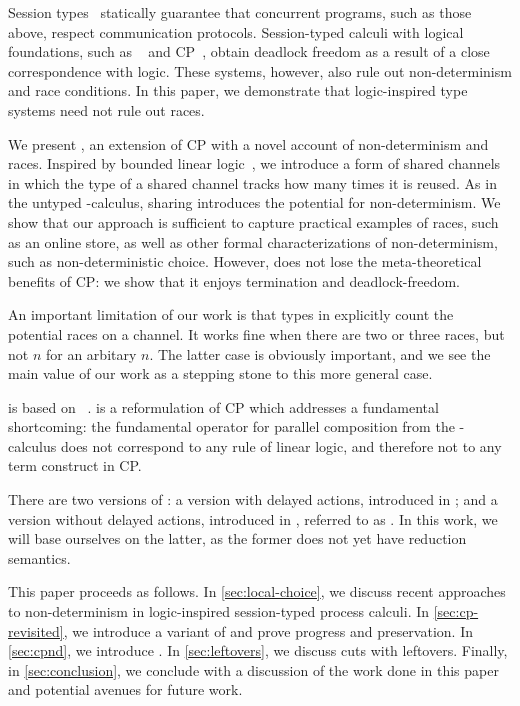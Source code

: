 \documentclass[envcountsame,envcountsect,UKenglish]{llncs}
\begin{document}
Session types~\parencite{honda1993} statically guarantee that concurrent programs, such as those above, respect communication protocols. Session-typed calculi with logical foundations, such as \piDILL~\parencite{caires2010} and CP~\parencite{wadler2012}, obtain deadlock freedom as a result of a close correspondence with logic. These systems, however, also rule out non-determinism and race conditions. In this paper, we demonstrate that logic-inspired type systems need not rule out races.

We present \nodcap, an extension of CP with a novel account of non-determinism and races. Inspired by bounded linear logic~\parencite{girard1992}, we introduce a form of shared channels in which the type of a shared channel tracks how many times it is reused. As in the untyped \textpi-calculus, sharing introduces the potential for non-determinism. We show that our approach is sufficient to capture practical examples of races, such as an online store, as well as other formal characterizations of non-determinism, such as non-deterministic choice.  However, \nodcap does not lose the meta-theoretical benefits of CP: we show that it enjoys termination and deadlock-freedom.

An important limitation of our work is that types in \nodcap explicitly count the potential races on a channel.  It works fine when there are two or three races, but not $n$ for an arbitary $n$.  The latter case is obviously important, and we see the main value of our work as a stepping stone to this more general case.

\nodcap is based on \dhcp~\parencite{kokke2018tlla,kokke2019pacmpl}. \dhcp is a reformulation of CP which addresses a fundamental shortcoming: the fundamental operator for parallel composition from the \textpi-calculus does not correspond to any rule of linear logic, and therefore not to any term construct in CP.

There are two versions of \dhcp: a version with delayed actions, introduced in \textcite{kokke2019pacmpl}; and a version without delayed actions, introduced in \textcite{kokke2018tlla}, referred to as \hcp. In this work, we will base ourselves on the latter, as the former does not yet have reduction semantics.

This paper proceeds as follows. In \cref{sec:local-choice}, we discuss recent approaches to non-determinism in logic-inspired session-typed process calculi. In \cref{sec:cp-revisited}, we introduce a variant of \cp and prove progress and preservation. In \cref{sec:cpnd}, we introduce \nodcap. In \cref{sec:leftovers}, we discuss cuts with leftovers. Finally, in \cref{sec:conclusion}, we conclude with a discussion of the work done in this paper and potential avenues for future work.
\end{document}
